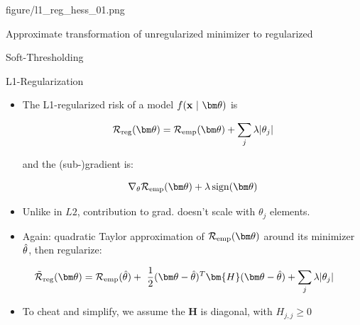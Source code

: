 \documentclass[11pt,compress,t,notes=noshow, xcolor=table]{beamer}
\begin{document}
{figure/l1_reg_hess_01.png}{
    \item Approximate transformation of unregularized minimizer to regularized 
    \item Soft-Thresholding
}

\begin{vbframe} {L1-Regularization}
  

  \begin{itemize}
    \item The L1-regularized risk of a model $\fxt$ is

      \[
     \mathcal{R}_{\text{reg}}(\thetav) = \mathcal{R}_{\text{emp}}(\thetav) + \sum_j \lambda |\theta_j|
      \] 
      
      and the (sub-)gradient is:
      
      
      $$ \nabla_{\theta} \risket + \lambda \sign(\thetav) $$

    \item Unlike in $L2$, contribution to grad. doesn't scale with $\theta_j$ elements. 
    \item Again: quadratic Taylor approximation of $\mathcal{R}_{\text{emp}}(\thetav)$ around its minimizer $\hat{\theta}$, then regularize:
  \end{itemize}

 $$\mathcal{\tilde R}_{\text{reg}}(\thetav) = \mathcal{R}_{\text{emp}}(\thetah) +\ \frac{1}{2} (\thetav - \thetah)^T \bm{H} (\thetav - \thetah)  + \sum_j \lambda |\theta_j|$$
  
  \framebreak
  
  \begin{itemize}

\item To cheat and simplify, we assume the $\bm{H}$ is diagonal, with $H_{j,j} \geq 0$
  

\end{itemize}
\end{vbframe}
\end{document}
